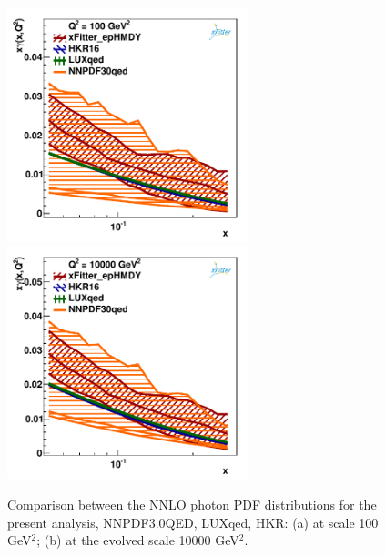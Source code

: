 \begin{figure}
\includegraphics[width=7cm]{photon_comp_100.pdf} 
\includegraphics[width=7cm]{photon_comp_10000.pdf} 
\caption{Comparison between the NNLO photon PDF distributions for the present analysis, NNPDF3.0QED, LUXqed, HKR: (a) at scale 100 GeV$^{2}$; (b) at the evolved scale 10000 GeV$^{2}$.}
\label{photon_zoom}
\end{figure}

